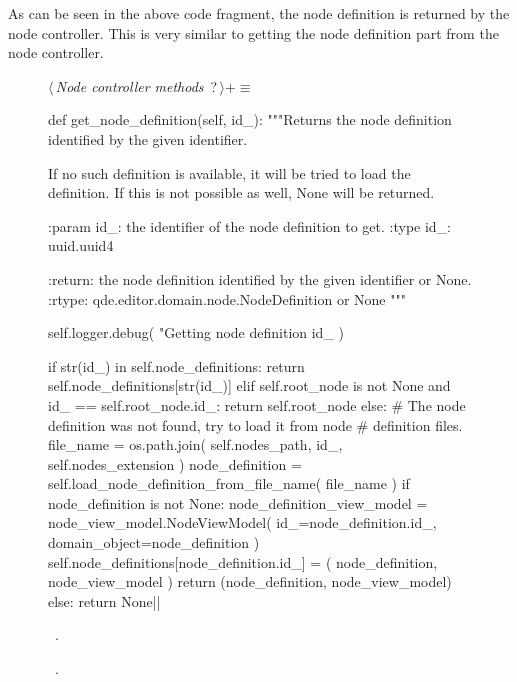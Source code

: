 \documentclass[%
    a4paper,    %
    justified,  %
    nobib,      %
    openany     %
]{tufte-book}
\begin{document}
As can be seen in the above code fragment, the node definition is returned by
the node controller. This is very similar to getting the node definition part
from the node controller.

\begin{figure}
\begin{flushleft} \small
\begin{minipage}{\linewidth}\label{scrap141}\raggedright\small
{} $\langle\,${\itshape Node controller methods}\nobreak\ {\footnotesize {?}}$\,\rangle+\equiv$
\vspace{-1ex}
\begin{pythoncode}
def get_node_definition(self, id_):
    """Returns the node definition identified by the given identifier.

    If no such definition is available, it will be tried to load the
    definition. If this is not possible as well, None will be returned.

    :param id_: the identifier of the node definition to get.
    :type  id_: uuid.uuid4

    :return: the node definition identified by the given identifier or None.
    :rtype:  qde.editor.domain.node.NodeDefinition or None
    """

    self.logger.debug(
        "Getting node definition %
        id_
    )

    if str(id_) in self.node_definitions:
        return self.node_definitions[str(id_)]
    elif self.root_node is not None and id_ == self.root_node.id_:
        return self.root_node
    else:
        # The node definition was not found, try to load it from node
        # definition files.
        file_name = os.path.join(
            self.nodes_path,
            id_,
            self.nodes_extension
        )
        node_definition = self.load_node_definition_from_file_name(
            file_name
        )
        if node_definition is not None:
            node_definition_view_model = node_view_model.NodeViewModel(
                id_=node_definition.id_,
                domain_object=node_definition
            )
            self.node_definitions[node_definition.id_] = (
                node_definition,
                node_view_model
            )
            return (node_definition, node_view_model)
        else:
            return None|\NWsep|
\end{pythoncode}
\vspace{1.5ex}
\footnotesize
\begin{list}{}{\setlength{\itemsep}{-\parsep}\setlength{\itemindent}{-\leftmargin}}
\item \NWtxtMacroDefBy\ .
\item \NWtxtMacroRefIn\ .


\end{list}
\end{minipage}
\end{flushleft}
\end{figure}
\end{document}
